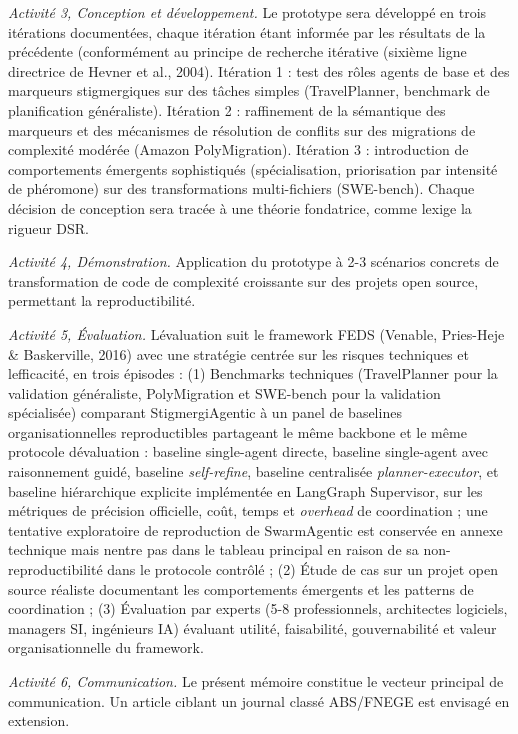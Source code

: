 \documentclass[12pt,a4paper]{article}
\begin{document}
\emph{Activité 3, Conception et développement.}
Le prototype sera développé en trois itérations documentées, chaque
itération étant informée par les résultats de la précédente (conformément
au principe de recherche itérative (sixième ligne directrice de Hevner
et al., 2004). Itération 1 : test des rôles agents de base et des
marqueurs stigmergiques sur des tâches simples (TravelPlanner, benchmark
de planification généraliste). Itération 2 : raffinement de la
sémantique des marqueurs et des mécanismes de résolution de conflits sur
des migrations de complexité modérée (Amazon PolyMigration). Itération
3 : introduction de comportements émergents sophistiqués
(spécialisation, priorisation par intensité de phéromone) sur des
transformations multi-fichiers (SWE-bench). Chaque décision de
conception sera tracée à une théorie fondatrice, comme
l\textquotesingle exige la rigueur DSR.

\emph{Activité 4, Démonstration.}
Application du prototype à 2-3 scénarios concrets de transformation de
code de complexité croissante sur des projets open source, permettant
la reproductibilité.

\emph{Activité 5, Évaluation.}
L\textquotesingle évaluation suit le framework FEDS (Venable, Pries-Heje
\& Baskerville, 2016) avec une stratégie centrée sur les risques
techniques et l\textquotesingle efficacité, en trois épisodes :
(1) Benchmarks techniques (TravelPlanner pour la validation généraliste,
PolyMigration et SWE-bench pour la validation spécialisée) comparant
StigmergiAgentic à un panel de baselines organisationnelles
reproductibles partageant le même backbone et le même protocole
d\textquotesingle évaluation : baseline single-agent directe, baseline
single-agent avec raisonnement guidé, baseline \emph{self-refine},
baseline centralisée \emph{planner-executor}, et baseline
hiérarchique explicite implémentée en LangGraph Supervisor, sur les
métriques de précision officielle, coût, temps et \emph{overhead} de
coordination ; une tentative exploratoire de reproduction de
SwarmAgentic est conservée en annexe technique mais n\textquotesingle entre
pas dans le tableau principal en raison de sa non-reproductibilité dans
le protocole contrôlé ;
(2) Étude de cas sur un projet open source réaliste documentant les
comportements émergents et les patterns de coordination ;
(3) Évaluation par experts (5-8 professionnels, architectes logiciels,
managers SI, ingénieurs IA) évaluant utilité, faisabilité,
gouvernabilité et valeur organisationnelle du framework.

\emph{Activité 6, Communication.}
Le présent mémoire constitue le vecteur principal de communication.
Un article ciblant un journal classé ABS/FNEGE est envisagé en
extension.
\end{document}
